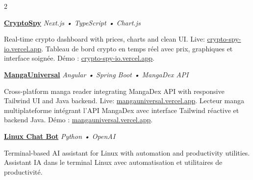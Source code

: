 \documentclass[10pt,a4paper]{article}
\begin{document}
\begin{paracol}{2}
\vspace{0.9em}


\textbf{
\href{https://github.com/AymanLyesri/CryptoSpy}
{CryptoSpy}
}
\hfill
\textit{Next.js • TypeScript • Chart.js}

\smallskip

{
Real-time crypto dashboard with prices, charts and clean UI. Live: \href{https://crypto-spy-io.vercel.app}{crypto-spy-io.vercel.app}.
}
{
Tableau de bord crypto en temps réel avec prix, graphiques et interface soignée. Démo : \href{https://crypto-spy-io.vercel.app}{crypto-spy-io.vercel.app}.
}
\vspace{0.9em}


\textbf{
\href{https://github.com/AymanLyesri/MangaUniversal}
{MangaUniversal}
}
\hfill
\textit{Angular • Spring Boot • MangaDex API}

\smallskip

{
Cross-platform manga reader integrating MangaDex API with responsive Tailwind UI and Java backend. Live: \href{https://mangauniversal.vercel.app}{mangauniversal.vercel.app}.
}
{
Lecteur manga multiplateforme intégrant l'API MangaDex avec interface Tailwind réactive et backend Java. Démo : \href{https://mangauniversal.vercel.app}{mangauniversal.vercel.app}.
}
\vspace{0.9em}


\textbf{
\href{https://github.com/AymanLyesri/linux-chat-bot}
{Linux Chat Bot}
}
\hfill
\textit{Python • OpenAI}

\smallskip

{
Terminal-based AI assistant for Linux with automation and productivity utilities.
}
{
Assistant IA dans le terminal Linux avec automatisation et utilitaires de productivité.
}

\vspace{1em}

{\footnotesize
\href{https://github.com/AymanLyesri/CurriculumVitae}
{\faGithub\; }
}

\end{paracol}
\end{document}
